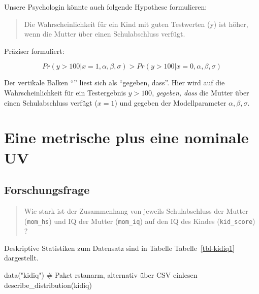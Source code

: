 \documentclass[
  a4paper,
  DIV=11]{scrreprt}
\newenvironment{Shaded}{\begin{snugshade}}{\end{snugshade}}
\newcommand{\CommentTok}[1]{\textcolor[rgb]{0.37,0.37,0.37}{#1}}
\newcommand{\FunctionTok}[1]{\textcolor[rgb]{0.28,0.35,0.67}{#1}}
\newcommand{\NormalTok}[1]{\textcolor[rgb]{0.00,0.23,0.31}{#1}}
\newcommand{\StringTok}[1]{\textcolor[rgb]{0.13,0.47,0.30}{#1}}
\theoremstyle{definition}
\theoremstyle{remark}
\begin{document}
Unsere Psychologin könnte auch folgende Hypothese formulieren:

\begin{quote}
Die Wahrscheinlichkeit für ein Kind mit guten Testwerten (y) ist höher,
wenn die Mutter über einen Schulabschluss verfügt.
\end{quote}

Präziser formuliert:

\[Pr(y > 100|x=1, \alpha, \beta, \sigma) > Pr(y > 100|x=0, \alpha, \beta, \sigma)\]

Der vertikale Balken ``\textbar{}'' liest sich als ``gegeben, dass''.
Hier wird auf die Wahrscheinlichkeit für ein Testergebnis \(y>100\),
\emph{gegeben, dass} die Mutter über einen Schulabschluss verfügt
(\(x=1\)) und gegeben der Modellparameter \(\alpha, \beta, \sigma\).

\hypertarget{eine-metrische-plus-eine-nominale-uv}{%
\section{Eine metrische plus eine nominale
UV}\label{eine-metrische-plus-eine-nominale-uv}}

\hypertarget{forschungsfrage-1}{%
\subsection{Forschungsfrage}\label{forschungsfrage-1}}

\begin{quote}
Wie stark ist der Zusammenhang von jeweils Schulabschluss der Mutter
(\texttt{mom\_hs}) und IQ der Mutter (\texttt{mom\_iq}) auf den IQ des
Kindes (\texttt{kid\_score}) ?
\end{quote}

Deskriptive Statistiken zum Datensatz sind in Tabelle
Tabelle~\ref{tbl-kidiq1} dargestellt.

\begin{Shaded}
\begin{Highlighting}[]
\FunctionTok{data}\NormalTok{(}\StringTok{"kidiq"}\NormalTok{)  }\CommentTok{\# Paket rstanarm, alternativ über CSV einlesen}
\FunctionTok{describe\_distribution}\NormalTok{(kidiq)}
\end{Highlighting}
\end{Shaded}
\end{document}
